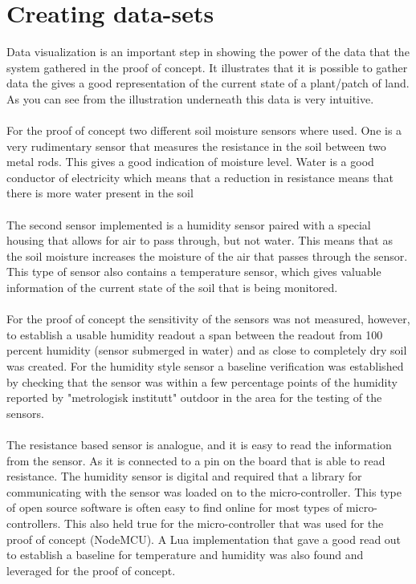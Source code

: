 \documentclass[]{uiophd}
\begin{document}
\section{Creating data-sets}
Data visualization is an important step in showing the power of the data that the system gathered in the proof of concept. It illustrates that it is possible to gather data the gives a good representation of the current state of a plant/patch of land. As you can see from the illustration underneath this data is very intuitive.
\\\\
For the proof of concept two different soil moisture sensors where used. One is a very rudimentary sensor that measures the resistance in the soil between two metal rods. This gives a good indication of moisture level. Water is a good conductor of electricity which means that a reduction in resistance means that there is more water present in the soil
\\\\
The second sensor implemented is a humidity sensor paired with a special housing that allows for air to pass through, but not water. This means that as the soil moisture increases the moisture of the air that passes through the sensor. This type of sensor also contains a temperature sensor, which gives valuable information of the current state of the soil that is being monitored.
\\\\
For the proof of concept the sensitivity of the sensors was not measured, however, to establish a usable humidity readout a span between the readout from 100 percent humidity (sensor submerged in water) and as close to completely dry soil was created. For the humidity style sensor a baseline verification was established by checking that the sensor was within a few percentage points of the humidity reported by "metrologisk institutt" outdoor in the area for the testing of the sensors.
\\\\
The resistance based sensor is analogue, and it is easy to read the information from the sensor. As it is connected to a pin on the board that is able to read resistance. The humidity sensor is digital and required that a library for communicating with the sensor was loaded on to the micro-controller. This type of open source software is often easy to find online for most types of micro-controllers. This also held true for the micro-controller that was used for the proof of concept (NodeMCU). A Lua implementation that gave a good read out to establish a baseline for temperature and humidity was also found and leveraged for the proof of concept.
\end{document}
